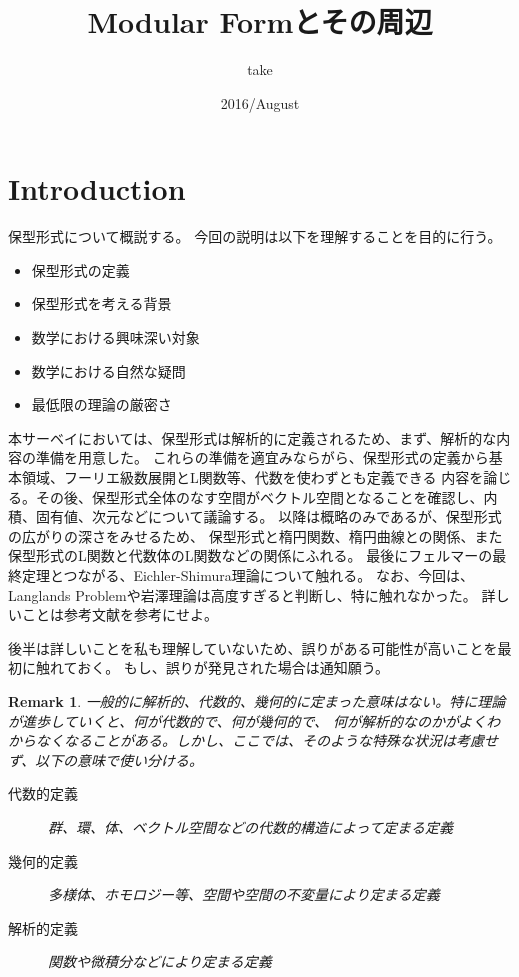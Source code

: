 \documentclass{ujarticle}
\title{Modular Formとその周辺}
\author{take}
\date{2016/August}
\newtheorem*{rem}{Remark}
\begin{document}
\maketitle
\tableofcontents


\section{Introduction}
\label{sec:Introduction}

保型形式について概説する。
今回の説明は以下を理解することを目的に行う。
\begin{itemize}
  \setlength{\parskip}{0cm} %
  \setlength{\itemsep}{0cm} %


  \item 保型形式の定義
  \item 保型形式を考える背景
  \item 数学における興味深い対象
  \item 数学における自然な疑問
  \item 最低限の理論の厳密さ
\end{itemize}

本サーベイにおいては、保型形式は解析的に定義されるため、まず、解析的な内容の準備を用意した。
これらの準備を適宜みならがら、保型形式の定義から基本領域、フーリエ級数展開とL関数等、代数を使わずとも定義できる
内容を論じる。その後、保型形式全体のなす空間がベクトル空間となることを確認し、内積、固有値、次元などについて議論する。
以降は概略のみであるが、保型形式の広がりの深さをみせるため、
保型形式と楕円関数、楕円曲線との関係、また保型形式のL関数と代数体のL関数などの関係にふれる。
最後にフェルマーの最終定理とつながる、Eichler-Shimura理論について触れる。
なお、今回は、Langlands Problemや岩澤理論は高度すぎると判断し、特に触れなかった。
詳しいことは参考文献を参考にせよ。

後半は詳しいことを私も理解していないため、誤りがある可能性が高いことを最初に触れておく。
もし、誤りが発見された場合は通知願う。



\begin{rem}
  一般的に解析的、代数的、幾何的に定まった意味はない。特に理論が進歩していくと、何が代数的で、何が幾何的で、
  何が解析的なのかがよくわからなくなることがある。しかし、ここでは、そのような特殊な状況は考慮せず、以下の意味で使い分ける。
　\begin{description}
    \item[代数的定義] 群、環、体、ベクトル空間などの代数的構造によって定まる定義
    \item[幾何的定義] 多様体、ホモロジー等、空間や空間の不変量により定まる定義
    \item[解析的定義] 関数や微積分などにより定まる定義
　\end{description}
\end{rem}
\end{document}
